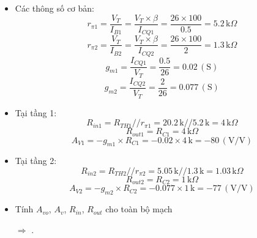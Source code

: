 \begin{itemize}[label=-]
	\item Các thông số cơ bản:
	\[
	r_{\pi 1} = \frac{V_T}{I_{B1}} = \frac{V_T \times \beta}{I_{CQ1}}
	= \frac{26 \times 100}{0.5} = 5.2\,\text{k}\Omega
	\]
	\[
	r_{\pi 2} = \frac{V_T}{I_{B2}} = \frac{V_T \times \beta}{I_{CQ2}}
	= \frac{26 \times 100}{2} = 1.3\,\text{k}\Omega
	\]
	\[
	g_{m1} = \frac{I_{CQ1}}{V_T} = \frac{0.5}{26} = 0.02\,(\text{S})
	\]
	\[
	g_{m2} = \frac{I_{CQ2}}{V_T} = \frac{2}{26} = 0.077\,(\text{S})
	\]
	
	\item Tại tầng 1:
	\[
	R_{in1} = R_{TH1} // r_{\pi1}
	= 20.2\,\text{k} // 5.2\,\text{k}
	= 4\,\text{k}\Omega
	\]
	\[
	R_{out1} = R_{C1} = 4\,\text{k}\Omega
	\]
	\[
	A_{V1} = -g_{m1} \times R_{C1}
	= -0.02 \times 4\,\text{k}
	= -80\,(\text{V/V})
	\]
	
	\item Tại tầng 2:
	\[
	R_{in2} = R_{TH2} // r_{\pi2}
	= 5.05\,\text{k} // 1.3\,\text{k}
	= 1.03\,\text{k}\Omega
	\]
	\[
	R_{out2} = R_{C2} = 1\,\text{k}\Omega
	\]
	\[
	A_{V2} = -g_{m2} \times R_{C2}
	= -0.077 \times 1\,\text{k}
	= -77\,(\text{V/V})
	\]
	
	\item Tính $ A_{vo}$, $A_{v}$, $R_{in}$, $R_{out}$ cho toàn bộ mạch
	
	$\Rightarrow$ .
	

\end{itemize}
